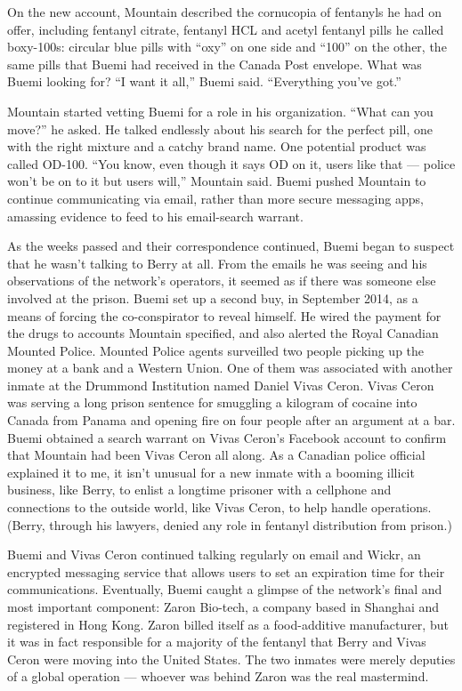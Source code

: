 On the new account, Mountain described the cornucopia of fentanyls he
had on offer, including fentanyl citrate, fentanyl HCL and acetyl
fentanyl pills he called boxy-100s: circular blue pills with ``oxy'' on
one side and ``100'' on the other, the same pills that Buemi had
received in the Canada Post envelope. What was Buemi looking for? ``I
want it all,'' Buemi said. ``Everything you've got.''

Mountain started vetting Buemi for a role in his organization. ``What
can you move?'' he asked. He talked endlessly about his search for the
perfect pill, one with the right mixture and a catchy brand name. One
potential product was called OD-100. ``You know, even though it says OD
on it, users like that --- police won't be on to it but users will,''
Mountain said. Buemi pushed Mountain to continue communicating via
email, rather than more secure messaging apps, amassing evidence to feed
to his email-search warrant.

As the weeks passed and their correspondence continued, Buemi began to
suspect that he wasn't talking to Berry at all. From the emails he was
seeing and his observations of the network's operators, it seemed as if
there was someone else involved at the prison. Buemi set up a second
buy, in September 2014, as a means of forcing the co-conspirator to
reveal himself. He wired the payment for the drugs to accounts Mountain
specified, and also alerted the Royal Canadian Mounted Police. Mounted
Police agents surveilled two people picking up the money at a bank and a
Western Union. One of them was associated with another inmate at the
Drummond Institution named Daniel Vivas Ceron. Vivas Ceron was serving a
long prison sentence for smuggling a kilogram of cocaine into Canada
from Panama and opening fire on four people after an argument at a bar.
Buemi obtained a search warrant on Vivas Ceron's Facebook account to
confirm that Mountain had been Vivas Ceron all along. As a Canadian
police official explained it to me, it isn't unusual for a new inmate
with a booming illicit business, like Berry, to enlist a longtime
prisoner with a cellphone and connections to the outside world, like
Vivas Ceron, to help handle operations. (Berry, through his lawyers,
denied any role in fentanyl distribution from prison.)

Buemi and Vivas Ceron continued talking regularly on email and Wickr, an
encrypted messaging service that allows users to set an expiration time
for their communications. Eventually, Buemi caught a glimpse of the
network's final and most important component: Zaron Bio-tech, a company
based in Shanghai and registered in Hong Kong. Zaron billed itself as a
food-additive manufacturer, but it was in fact responsible for a
majority of the fentanyl that Berry and Vivas Ceron were moving into the
United States. The two inmates were merely deputies of a global
operation --- whoever was behind Zaron was the real mastermind.

